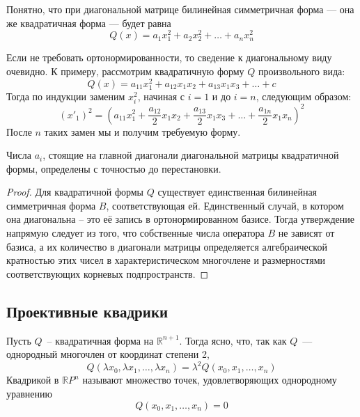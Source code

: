 \documentclass[11pt]{article}
\begin{document}
    \begin{remark}
    Понятно, что при диагональной матрице билинейная симметричная форма --- она же квадратичная форма --- будет равна
    \begin{equation*}
        Q(x) = a_1x_1^2 + a_2x_2^2 + \hdots + a_nx_n^2
    \end{equation*}
    \end{remark}

    \begin{remark}
    Если не требовать ортонормированности, то сведение к диагональному виду очевидно. К примеру, рассмотрим квадратичную форму $Q$ произвольного вида:
    \begin{equation*}
        Q(x) = a_{11}x_1^2 + a_{12}x_1x_2 + a_{13}x_1x_3 + \hdots + c
    \end{equation*}
    Тогда по индукции заменим $x_i^2$, начиная с $i = 1$ и до $i = n$, следующим образом:
    \begin{equation*}
        (x'_{1})^2 = (a_{11}x_1^2 + \dfrac{a_{12}}{2}x_1x_2 + \dfrac{a_{13}}{2}x_1x_3 + \hdots + \dfrac{a_{1n}}{2}x_1x_n)^2
    \end{equation*}
    После $n$ таких замен мы и получим требуемую форму.
    \end{remark}

    \begin{lemma}
    Числа $a_i$, стоящие на главной диагонали диагональной матрицы квадратичной формы, определены с точностью до перестановки.
    \end{lemma}

    \begin{proof}
    Для квадратичной формы $Q$ существует единственная билинейная симметричная форма $B$, соответствующая ей. Единственный случай, в котором она диагональна -- это её запись в ортонормированном базисе. Тогда утверждение напрямую следует из того, что собственные числа оператора $B$ не зависят от базиса, а их количество в диагонали матрицы определяется алгебраической кратностью этих чисел в характеристическом многочлене и размерностями соответствующих корневых подпространств.
    \end{proof}

    \subsection{Проективные квадрики}
    \begin{definition}
        Пусть $Q$~-- квадратичная форма на $\mathbb{R}^{n + 1}$. Тогда ясно, что, так как $Q$~--- однородный многочлен от координат степени 2,
        \[ Q(\lambda x_0, \lambda x_1, \ldots, \lambda x_n) = \lambda^2 Q(x_0, x_1, \ldots, x_n) \]
        Квадрикой в $\mathbb{R}P^n$ называют множество точек, удовлетворяющих однородному уравнению
        \[Q(x_0, x_1, \ldots, x_n) = 0 \]

    \end{definition}
\end{document}
